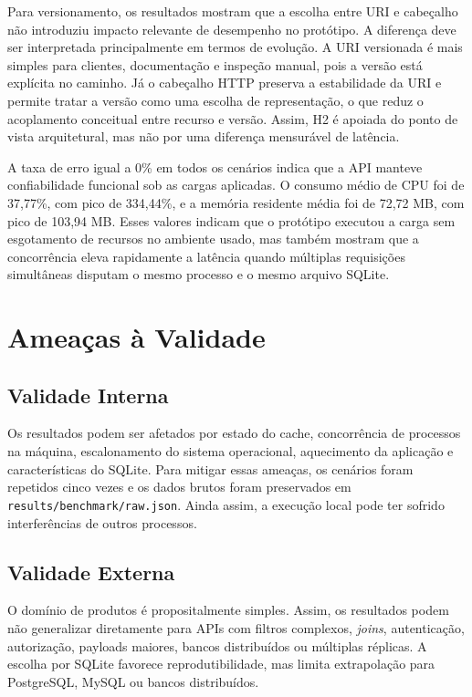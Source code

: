 \documentclass[journal]{IEEEtran}
\begin{document}
Para versionamento, os resultados mostram que a escolha entre URI e cabeçalho não introduziu impacto relevante de desempenho no protótipo. A diferença deve ser interpretada principalmente em termos de evolução. A URI versionada é mais simples para clientes, documentação e inspeção manual, pois a versão está explícita no caminho. Já o cabeçalho HTTP preserva a estabilidade da URI e permite tratar a versão como uma escolha de representação, o que reduz o acoplamento conceitual entre recurso e versão. Assim, H2 é apoiada do ponto de vista arquitetural, mas não por uma diferença mensurável de latência.

A taxa de erro igual a 0\% em todos os cenários indica que a API manteve confiabilidade funcional sob as cargas aplicadas. O consumo médio de CPU foi de 37,77\%, com pico de 334,44\%, e a memória residente média foi de 72,72 MB, com pico de 103,94 MB. Esses valores indicam que o protótipo executou a carga sem esgotamento de recursos no ambiente usado, mas também mostram que a concorrência eleva rapidamente a latência quando múltiplas requisições simultâneas disputam o mesmo processo e o mesmo arquivo SQLite.


\section{Ameaças à Validade}

\subsection{Validade Interna}

Os resultados podem ser afetados por estado do cache, concorrência de processos na máquina, escalonamento do sistema operacional, aquecimento da aplicação e características do SQLite. Para mitigar essas ameaças, os cenários foram repetidos cinco vezes e os dados brutos foram preservados em \texttt{results/benchmark/raw.json}. Ainda assim, a execução local pode ter sofrido interferências de outros processos.

\subsection{Validade Externa}

O domínio de produtos é propositalmente simples. Assim, os resultados podem não generalizar diretamente para APIs com filtros complexos, \textit{joins}, autenticação, autorização, payloads maiores, bancos distribuídos ou múltiplas réplicas. A escolha por SQLite favorece reprodutibilidade, mas limita extrapolação para PostgreSQL, MySQL ou bancos distribuídos.
\end{document}
